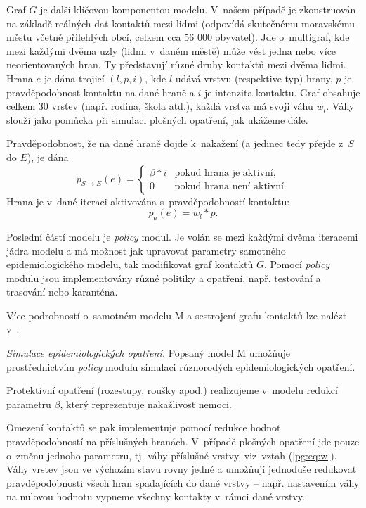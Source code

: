 Graf $G$ je další klíčovou komponentou modelu. V~našem případě je
zkonstruován na základě reálných dat kontaktů mezi lidmi (odpovídá
skutečnému moravskému městu včetně přilehlých obcí, celkem cca 56 000
obyvatel). Jde o~multigraf, kde mezi každými dvěma uzly (lidmi v~daném
městě) může vést jedna nebo více neorientovaných hran. Ty představují
různé druhy kontaktů mezi dvěma lidmi. Hrana $e$ je dána trojicí $(l,
p, i)$, kde $l$ udává vrstvu (respektive typ) hrany, $p$ je pravděpodobnost
kontaktu na dané hraně a $i$ je intenzita kontaktu. Graf
obsahuje celkem 30 vrstev (např. rodina, škola atd.), každá vrstva má svoji
váhu $w_l$. Váhy slouží jako pomůcka při simulaci plošných opatření,
jak ukážeme dále.

Pravděpodobnost, že na dané hraně dojde k~nakažení (a jedinec tedy přejde z~$S$
do $E$), je dána
\begin{equation}
  p_{S \rightarrow E}(e) = \begin{cases}
    \beta * i  & \mbox{pokud hrana je aktivní,} \\
    0          & \mbox{pokud hrana není aktivní.} 
    \end{cases}
\end{equation}
Hrana je v~dané iteraci aktivována s~pravděpodobností kontaktu:
\begin{equation}
\label{pg:eq:w}
p_a(e) = w_l * p.
\end{equation}

Poslední částí modelu je {\em policy} modul. Je volán se mezi každými dvěma
iteracemi jádra modelu a má možnost jak upravovat parametry samotného
epidemiologického modelu, tak modifikovat graf kontaktů $G$. Pomocí {\em policy} modulu
jsou implementovány různé politiky a opatření, např. testování a
trasování nebo karanténa. 

Více podrobností o~samotném modelu M a sestrojení grafu kontaktů lze nalézt v~\cite{M-techrep2021}.

\emph{Simulace epidemiologických opatření.} Popsaný model M umožňuje pro\-stře\-dnic\-tvím {\em policy} modulu simulaci různorodých epidemiologických opatření.

Protektivní opatření (rozestupy, roušky apod.) realizujeme v~modelu
redukcí parametru $\beta$, který reprezentuje nakažlivost nemoci.

Omezení kontaktů se pak implementuje pomocí redukce hodnot
prav\-dě\-po\-dob\-nos\-tí na příslušných hranách. V~případě plošných opatření
jde pouze o~změnu jednoho parametru, tj. váhy příslušné vrstvy,
viz~vztah (\ref{pg:eq:w}). Váhy vrstev jsou ve výchozím stavu rovny jedné a
umožňují jednoduše redukovat pravděpodobnosti všech hran spadajících
do dané vrstvy --  např. nastavením váhy na nulovou hodnotu vypneme
všechny kontakty v~rámci dané vrstvy.


